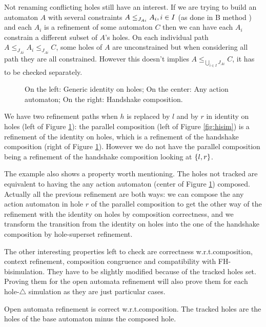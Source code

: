 \documentclass{article}
\begin{document}
Not renaming conflicting holes still have an interest.
If we are trying to build an automaton \(A\) with several constraints \(\wrel{A}{A_i}{J_{Ai}}, i \in I\) (as done in B method \cite{cansell:inria-00099794}) and each \(A_i\) is a refinement of some automaton \(C\) then we can have each \(A_i\) constrain a different subset of \(A\)'s holes.
On each individual path \(A \leq_{J_{Ai}} A_i \leq_{J_{Ai}} C\), some holes of \(A\) are unconstrained but when considering all path they are all constrained.
However this doesn't implies \(A \leq_{\bigcup_{i \in I} J_{Ai}} C\), it has to be checked separately.
\begin{exi}
\begin{figure}
\centering

\vrule

\vrule

\caption{On the left: Generic identity on holes; On the center: Any action automaton; On the right: Handshake composition.}
\label{fig:sevpathref}
\end{figure}
We have two refinement paths when \(h\) is replaced by \(l\) and by \(r\) in identity on holes (left of Figure \ref{fig:sevpathref}): the parallel composition (left of Figure \ref{fig:hisim}) is a refinement of the identity on holes, which is a refinement of the handshake composition (right of Figure \ref{fig:sevpathref}).
However we do not have the parallel composition being a refinement of the handshake composition looking at \(\mbrc{l, r}\).

The example also shows a property worth mentioning.
The holes not tracked are equivalent to having the any action automaton (center of Figure \ref{fig:sevpathref}) composed.
Actually all the previous refinement are both ways: we can compose the any action automaton in hole \(r\) of the parallel composition to get the other way of the refinement with the identity on holes by composition correctness, and we transform the transition from the identity on holes into the one of the handshake composition by hole-superset refinement.
\end{exi}
The other interesting properties left to check are correctness w.r.t.\@ composition, context refinement, composition congruence and compatibility with FH-bisimulation.
They have to be slightly modified because of the tracked holes set.
Proving them for the open automata refinement will also prove them for each hole-\(\triangle\) simulation as they are just particular cases.
\begin{thm}
Open automata refinement is correct w.r.t.\@ composition.
The tracked holes are the holes of the base automaton minus the composed hole.
\end{thm}
\end{document}
